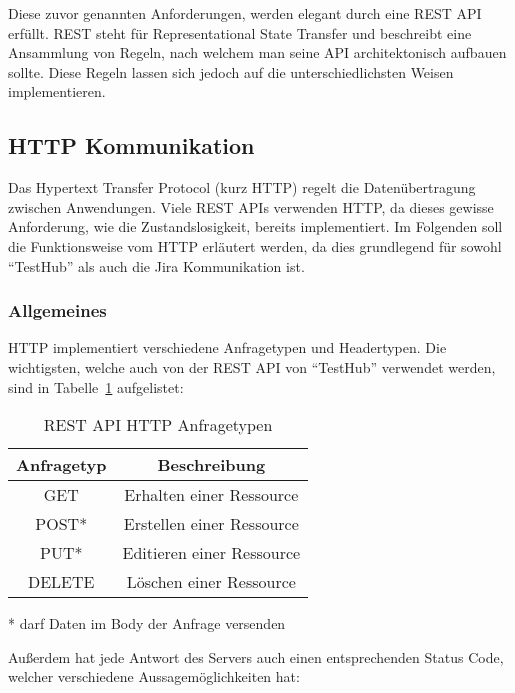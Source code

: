Diese zuvor genannten Anforderungen, werden elegant durch eine \gls{REST} \gls{API}
erfüllt. REST steht für Representational State Transfer und beschreibt eine Ansammlung von
Regeln, nach welchem man seine \gls{API} architektonisch aufbauen sollte. Diese 
Regeln lassen sich jedoch auf die unterschiedlichsten Weisen implementieren. 

\subsection{HTTP Kommunikation}\label{sec:HTTP}
Das Hypertext Transfer Protocol (kurz HTTP) regelt die Datenübertragung zwischen
Anwendungen. Viele \gls{REST} \gls{API}s verwenden HTTP, da dieses gewisse
Anforderung, wie die Zustandslosigkeit, bereits implementiert. Im Folgenden soll
die Funktionsweise vom HTTP erläutert werden, da dies grundlegend für sowohl ``TestHub''
als auch die \gls{Jira} Kommunikation ist.

\subsubsection{Allgemeines}
HTTP implementiert verschiedene Anfragetypen und Headertypen. Die wichtigsten,
welche auch von der \gls{REST} \gls{API} von ``TestHub'' verwendet werden, sind 
in Tabelle~\ref{table:requests} aufgelistet:

\begin{table}[H]
    \centering
    \begin{tabular}{|c | c|} 
     \hline
     \textbf{Anfragetyp} & \textbf{Beschreibung} \\ [1ex] 
     \hline
     GET & Erhalten einer Ressource \\ [1ex]
     \hline
     POST* & Erstellen einer Ressource \\ [1ex] 
     \hline
     PUT* & Editieren einer Ressource \\ [1ex] 
     \hline
     DELETE & Löschen einer Ressource \\ [1ex] 
     \hline
    \end{tabular}
    \caption{REST API HTTP Anfragetypen}
    * darf Daten im Body der Anfrage versenden
    \label{table:requests}
\end{table}

Außerdem hat jede Antwort des Servers auch einen entsprechenden Status Code, 
welcher verschiedene Aussagemöglichkeiten hat:

